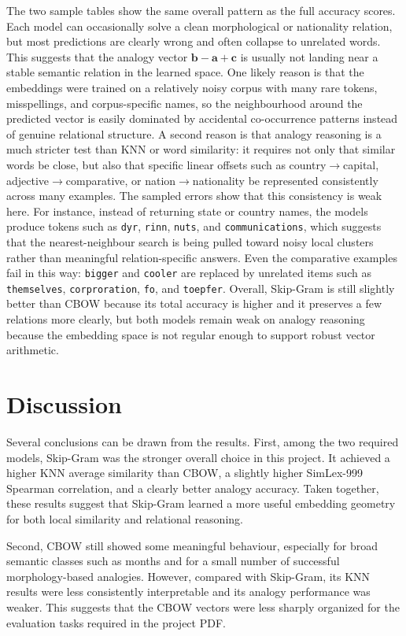 \documentclass[11pt,a4paper]{article}
\begin{document}
The two sample tables show the same overall pattern as the full accuracy scores. Each model can occasionally solve a clean morphological or nationality relation, but most predictions are clearly wrong and often collapse to unrelated words. This suggests that the analogy vector $\mathbf{b}-\mathbf{a}+\mathbf{c}$ is usually not landing near a stable semantic relation in the learned space. One likely reason is that the embeddings were trained on a relatively noisy corpus with many rare tokens, misspellings, and corpus-specific names, so the neighbourhood around the predicted vector is easily dominated by accidental co-occurrence patterns instead of genuine relational structure. A second reason is that analogy reasoning is a much stricter test than KNN or word similarity: it requires not only that similar words be close, but also that specific linear offsets such as country$\rightarrow$capital, adjective$\rightarrow$comparative, or nation$\rightarrow$nationality be represented consistently across many examples. The sampled errors show that this consistency is weak here. For instance, instead of returning state or country names, the models produce tokens such as \texttt{dyr}, \texttt{rinn}, \texttt{nuts}, and \texttt{communications}, which suggests that the nearest-neighbour search is being pulled toward noisy local clusters rather than meaningful relation-specific answers. Even the comparative examples fail in this way: \texttt{bigger} and \texttt{cooler} are replaced by unrelated items such as \texttt{themselves}, \texttt{corproration}, \texttt{fo}, and \texttt{toepfer}. Overall, Skip-Gram is still slightly better than CBOW because its total accuracy is higher and it preserves a few relations more clearly, but both models remain weak on analogy reasoning because the embedding space is not regular enough to support robust vector arithmetic.

\section{Discussion}
Several conclusions can be drawn from the results. First, among the two required models, Skip-Gram was the stronger overall choice in this project. It achieved a higher KNN average similarity than CBOW, a slightly higher SimLex-999 Spearman correlation, and a clearly better analogy accuracy. Taken together, these results suggest that Skip-Gram learned a more useful embedding geometry for both local similarity and relational reasoning.

Second, CBOW still showed some meaningful behaviour, especially for broad semantic classes such as months and for a small number of successful morphology-based analogies. However, compared with Skip-Gram, its KNN results were less consistently interpretable and its analogy performance was weaker. This suggests that the CBOW vectors were less sharply organized for the evaluation tasks required in the project PDF.
\end{document}
